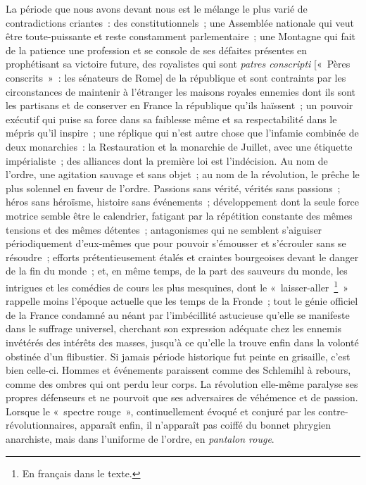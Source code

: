 \documentclass[french,twoside]{book} %
\begin{document}
La période que nous avons devant nous est le mélange le plus varié de contradictions criantes : des constitutionnels ; une Assemblée nationale qui veut être toute-puissante et reste constamment parlementaire ; une Montagne qui fait de la patience une profession et se console de ses défaites présentes en prophétisant sa victoire future, des royalistes qui sont \emph{patres conscripti} [« Pères conscrits » : les sénateurs de Rome] de la république et sont contraints par les circonstances de maintenir à l’étranger les maisons royales ennemies dont ils sont les partisans et de conserver en France la république qu’ils haïssent ; un pouvoir exécutif qui puise sa force dans sa faiblesse même et sa respectabilité dans le mépris qu’il inspire ; une réplique qui n’est autre chose que l’infamie combinée de deux monarchies : la Restauration et la monarchie de Juillet, avec une étiquette impérialiste ; des alliances dont la première loi est l’indécision. Au nom de l’ordre, une agitation sauvage et sans objet ; au nom de la révolution, le prêche le plus solennel en faveur de l’ordre. Passions sans vérité, vérités sans passions ; héros sans héroïsme, histoire sans événements ; développement dont la seule force motrice semble être le calendrier, fatigant par la répétition constante des mêmes tensions et des mêmes détentes ; antagonismes qui ne semblent s’aiguiser périodiquement d’eux-mêmes que pour pouvoir s’émousser et s’écrouler sans se résoudre ; efforts prétentieusement étalés et craintes bourgeoises devant le danger de la fin du monde ; et, en même temps, de la part des sauveurs du monde, les intrigues et les comédies de cours les plus mesquines, dont le « laisser-aller \footnote{En français dans le texte.} » rappelle moins l’époque actuelle que les temps de la Fronde ; tout le génie officiel de la France condamné au néant par l’imbécillité astucieuse qu’elle se manifeste dans le suffrage universel, cherchant son expression adéquate chez les ennemis invétérés des intérêts des masses, jusqu’à ce qu’elle la trouve enfin dans la volonté obstinée d’un flibustier. Si jamais période historique fut peinte en grisaille, c’est bien celle-ci. Hommes et événements paraissent comme des Schlemihl à rebours, comme des ombres qui ont perdu leur corps. La révolution elle-même paralyse ses propres défenseurs et ne pourvoit que ses adversaires de véhémence et de passion. Lorsque le « spectre rouge », continuellement évoqué et conjuré par les contre-révolutionnaires, apparaît enfin, il n’apparaît pas coiffé du bonnet phrygien anarchiste, mais dans l’uniforme de l’ordre, en \emph{pantalon rouge}.\par
\end{document}
